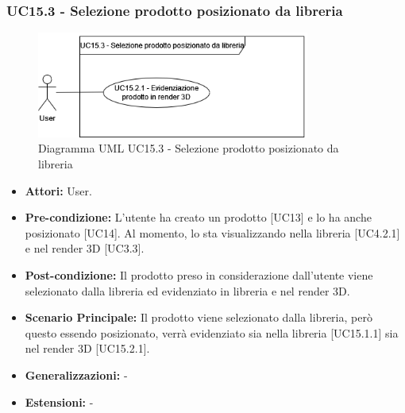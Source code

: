 \subsubsection{UC15.3 - Selezione prodotto posizionato da libreria}
\begin{figure}[H]
  \centering
  \includegraphics[width=0.8\textwidth]{UC_diagrams_11-20/UC15.3.drawio.png}
   \caption{Diagramma UML UC15.3 - Selezione prodotto posizionato da libreria}
\end{figure}
\begin{itemize}
    \item \textbf{Attori:} User.
    \item \textbf{Pre-condizione:} L'utente ha creato un prodotto [UC13] e lo ha anche posizionato [UC14]. Al momento, lo sta visualizzando nella libreria [UC4.2.1] e nel render 3D [UC3.3].
    \item \textbf{Post-condizione:} Il prodotto preso in considerazione dall'utente viene selezionato dalla libreria ed evidenziato in libreria e nel render 3D.
    \item \textbf{Scenario Principale:} Il prodotto viene selezionato dalla libreria, però questo essendo posizionato, verrà evidenziato sia nella libreria [UC15.1.1] sia nel render 3D [UC15.2.1].
    \item \textbf{Generalizzazioni:} -
    \item \textbf{Estensioni:} -
\end{itemize}

